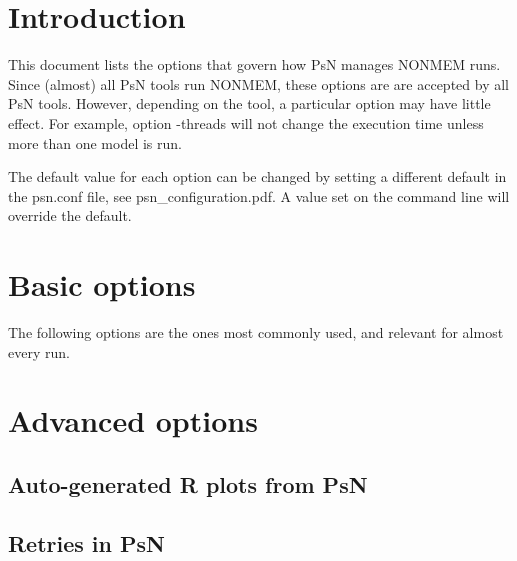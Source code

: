 

\usepackage{hyperref}



\maketitle
\newcommand{\guidetoolname}{<toolname>}
\tableofcontents
\newpage

\section{Introduction}
This document lists the options that govern how PsN manages NONMEM runs. Since (almost) all PsN tools run NONMEM, these options are 
are accepted by all PsN tools. However, depending on the tool, a particular option may have little effect. For example, option -threads will not change the execution time unless more than one model is run. 

The default value for each option can be changed by setting a different default in the psn.conf file, see psn\_configuration.pdf. A value set on the command line will override the default.

\section{Basic options}
The following options are the ones most commonly used, and relevant for almost every run.


\section{Advanced options}
\subsection{Auto-generated R plots from PsN}
\newcommand{\rplotsconditions}{
Most default templates depend on a couple of R libraries. The R-scripts subdirectory contains, in addition to all the default templates, a script required\_packages.R that can be run to install all the packages used by one or more of the default templates.
If the required R libraries for a particular template are not installed then no pdf will be generated. Check the .Rout file in the main run directory for error messages.
}


\subsection{Retries in PsN}


